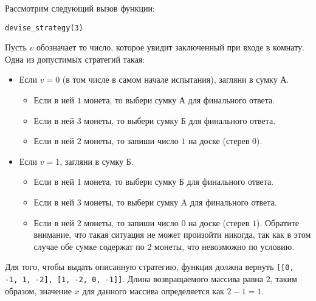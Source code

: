 
Рассмотрим следующий вызов функции:

\texttt{devise\_strategy(3)}

Пусть $v$ обозначает то число, которое увидит заключенный при входе в комнату.
Одна из допустимых стратегий такая:

\begin{itemize}
\item Если $v = 0$ (в том числе в самом начале испытания), загляни в сумку А.
\begin{itemize}
  \item Если в ней $1$ монета, то выбери сумку А для финального ответа.
  \item Если в ней $3$ монеты, то выбери сумку Б для финального ответа.
  \item Если в ней $2$ монеты, то запиши число $1$ на доске (стерев $0$).
   \end{itemize}
\item Если $v = 1$, загляни в сумку Б.
\begin{itemize}
  \item Если в ней $1$ монета, то выбери сумку Б для финального ответа.
  \item Если в ней $3$ монеты, то выбери сумку A для финального ответа.
  \item Если в ней $2$ монеты, то запиши число $0$ на доске (стерев $1$). Обратите внимание, что такая ситуация не может произойти никогда, так как в этом случае обе сумке содержат по $2$ монеты, что невозможно по условию.
  \end{itemize}
 \end{itemize}
 
Для того, чтобы выдать описанную стратегию, функция должна вернуть \texttt{[[0, -1, 1, -2], [1, -2, 0, -1]]}.
Длина возвращаемого массива равна $2$, таким образом, значение $x$ для данного массива определяется как $2 - 1 = 1$.


